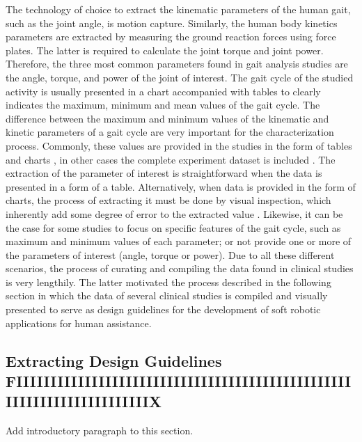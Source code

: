 The technology of choice to extract the kinematic parameters of the human gait, such as the joint angle, is motion capture. Similarly, the human body kinetics parameters are extracted by measuring the ground reaction forces using force plates. The latter is required to calculate the joint torque and joint power. Therefore, the three most common parameters found in gait analysis studies are the angle, torque, and power of the joint of interest. The gait cycle of the studied activity is usually presented in a chart accompanied with tables to clearly indicates the maximum, minimum and mean values of the gait cycle. The difference between the maximum and minimum values of the kinematic and kinetic parameters of a gait cycle are very important for the characterization process. Commonly, these values are provided in the studies in the form of tables and charts \cite{han2011biomechanical,yali2010biomechanics}, in other cases the complete experiment dataset is included \cite{moore2015elaborate}. The extraction of the parameter of interest is straightforward when the data is presented in a form of a table. Alternatively, when data is provided in the form of charts, the process of extracting it must be done by visual inspection, which inherently add some degree of error to the extracted value \cite{protopapadaki2007hip,riener2002stair,mcintosh2006gait,roebroeck1994biomechanics,mak2003joint}. Likewise, it can be the case for some studies to focus on specific features of the gait cycle, such as maximum and minimum values of each parameter; or not provide one or more of the parameters of interest (angle, torque or power). Due to all these different scenarios, the process of curating and compiling the data found in clinical studies is very lengthily. The latter motivated the process described in the following section in which the data of several clinical studies is compiled and visually presented to serve as design guidelines for the development of soft robotic applications for human assistance.

\subsection{Extracting Design Guidelines FIIIIIIIIIIIIIIIIIIIIIIIIIIIIIIIIIIIIIIIIIIIIIIIIIIIIIIIIIIIIIIIIIIIIIIX}

Add introductory paragraph to this section.

